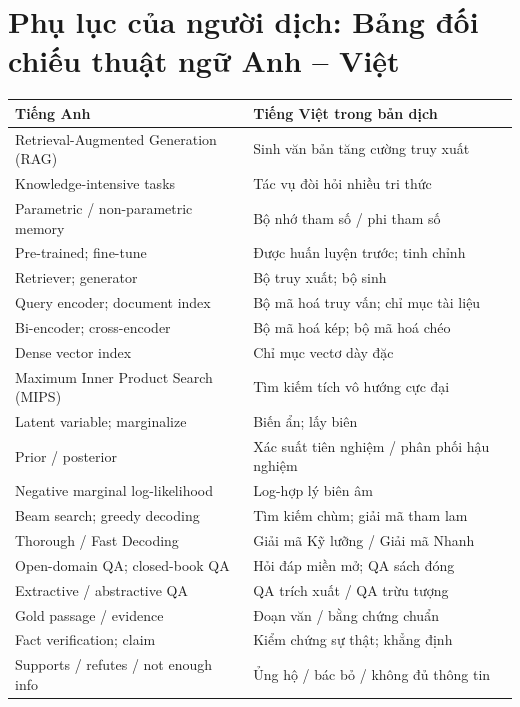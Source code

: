 \documentclass[10pt,letterpaper]{article}
\begin{document}
\section*{Phụ lục của người dịch: Bảng đối chiếu thuật ngữ Anh -- Việt}

{\small
\begin{tabularx}{\textwidth}{@{}>{\raggedright}p{}
    >{\raggedright\arraybackslash}X@{}}
  \toprule
  Tiếng Anh & Tiếng Việt trong bản dịch\\
  \midrule
  Retrieval-Augmented Generation (RAG) & Sinh văn bản tăng cường truy xuất\\
  Knowledge-intensive tasks & Tác vụ đòi hỏi nhiều tri thức\\
  Parametric / non-parametric memory & Bộ nhớ tham số / phi tham số\\
  Pre-trained; fine-tune & Được huấn luyện trước; tinh chỉnh\\
  Retriever; generator & Bộ truy xuất; bộ sinh\\
  Query encoder; document index & Bộ mã hoá truy vấn; chỉ mục tài liệu\\
  Bi-encoder; cross-encoder & Bộ mã hoá kép; bộ mã hoá chéo\\
  Dense vector index & Chỉ mục vectơ dày đặc\\
  Maximum Inner Product Search (MIPS) & Tìm kiếm tích vô hướng cực đại\\
  Latent variable; marginalize & Biến ẩn; lấy biên\\
  Prior / posterior & Xác suất tiên nghiệm / phân phối hậu nghiệm\\
  Negative marginal log-likelihood & Log-hợp lý biên âm\\
  Beam search; greedy decoding & Tìm kiếm chùm; giải mã tham lam\\
  Thorough / Fast Decoding & Giải mã Kỹ lưỡng / Giải mã Nhanh\\
  Open-domain QA; closed-book QA & Hỏi đáp miền mở; QA sách đóng\\
  Extractive / abstractive QA & QA trích xuất / QA trừu tượng\\
  Gold passage / evidence & Đoạn văn / bằng chứng chuẩn\\
  Fact verification; claim & Kiểm chứng sự thật; khẳng định\\
  Supports / refutes / not enough info & Ủng hộ / bác bỏ / không đủ thông tin\\

\end{tabularx}}
\end{document}

